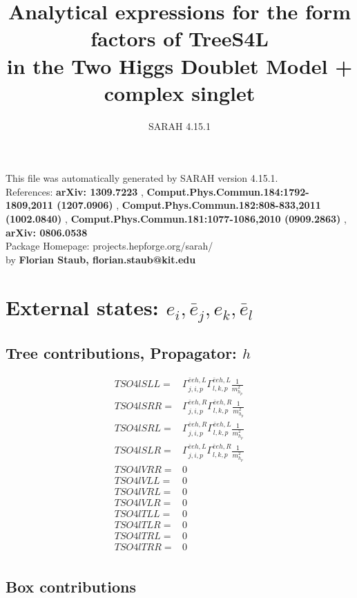 \documentclass[A4,landscape]{article}
\begin{document}
\title{Analytical expressions for the form factors of TreeS4L\\ in the Two Higgs Doublet Model + complex singlet } 
 \author{SARAH 4.15.1} 
 \maketitle 
 \vspace{10cm} 
This file was automatically generated by SARAH version 4.15.1.  \\ 
References: {\bf arXiv: 1309.7223 }, {\bf Comput.Phys.Commun.184:1792-1809,2011 (1207.0906) }, {\bf Comput.Phys.Commun.182:808-833,2011 (1002.0840) }, {\bf Comput.Phys.Commun.181:1077-1086,2010 (0909.2863) }, {\bf arXiv: 0806.0538 } \\ 
Package Homepage: projects.hepforge.org/sarah/ \\ 
by {\bf Florian Staub, florian.staub@kit.edu} 
 \pagebreak 
 \tableofcontents 
 \pagebreak 
\section{External states: ${e_{{i}}, \bar{e}_{{j}}, e_{{k}}, \bar{e}_{{l}}}$} 
\subsection{Tree contributions, Propagator: $h$} 

\begin{align} 
  TSO4lSLL= & \Gamma^{\bar{e}e h ,L}_{j, i, p} \Gamma^{\bar{e}e h ,L}_{l, k, p} \frac{1}{m^2_{h_{{p}}}} \\ 
  TSO4lSRR= & \Gamma^{\bar{e}e h ,R}_{j, i, p} \Gamma^{\bar{e}e h ,R}_{l, k, p} \frac{1}{m^2_{h_{{p}}}} \\ 
  TSO4lSRL= & \Gamma^{\bar{e}e h ,R}_{j, i, p} \Gamma^{\bar{e}e h ,L}_{l, k, p} \frac{1}{m^2_{h_{{p}}}} \\ 
  TSO4lSLR= & \Gamma^{\bar{e}e h ,L}_{j, i, p} \Gamma^{\bar{e}e h ,R}_{l, k, p} \frac{1}{m^2_{h_{{p}}}} \\ 
  TSO4lVRR= & 0 \\ 
  TSO4lVLL= & 0 \\ 
  TSO4lVRL= & 0 \\ 
  TSO4lVLR= & 0 \\ 
  TSO4lTLL= & 0 \\ 
  TSO4lTLR= & 0 \\ 
  TSO4lTRL= & 0 \\ 
  TSO4lTRR= & 0 \\ 
\end{align} 
\subsection{Box contributions} 
\end{document}
